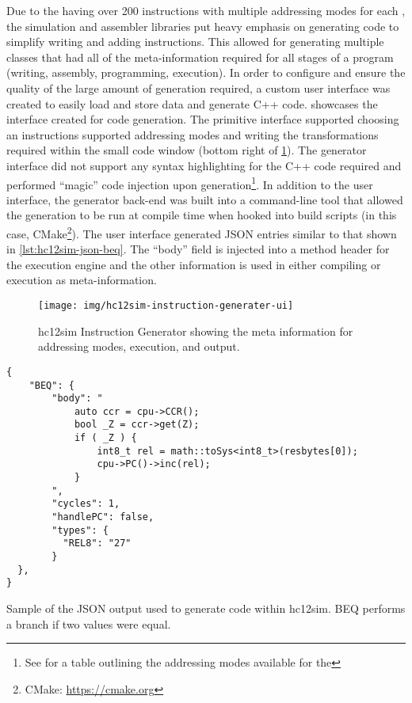 Due to the \hcmodel{} having over 200 instructions with multiple addressing modes for each \cite{hc12Manual2006}, the simulation and assembler libraries put heavy emphasis on generating code to simplify writing and adding instructions. This allowed for generating multiple classes that had all of the meta-information required for all stages of a program (writing, assembly, programming, execution). In order to configure and ensure the quality of the large amount of generation required, a custom user interface was created to easily load and store data and generate C++ code.  showcases the interface created for code generation. The primitive interface supported choosing an instructions supported addressing modes and writing the transformations required within the small code window (bottom right of \cref{fig:hc12sim-instruction-generater-ui}). The generator interface did not support any syntax highlighting for the C++ code required and performed ``magic'' code injection upon generation\footnote{See \cite[Table~3-1,~p.~30]{hc12Manual2006} for a table outlining the addressing modes available for the \hcmodel{}}. In addition to the user interface, the generator back-end was built into a command-line tool that allowed the generation to be run at compile time when hooked into build scripts (in this case, CMake\footnote{CMake: \url{https://cmake.org}}). The user interface generated JSON entries similar to that shown in \cref{lst:hc12sim-json-beq}. The ``body'' field is injected into a method header for the execution engine and the other information is used in either compiling or execution as meta-information.

\begin{figure}[h!t]
    \centering
    \texttt{[image: img/hc12sim-instruction-generater-ui]}
    \caption{hc12sim Instruction Generator showing the meta information for addressing modes, execution, and output.}
    \label{fig:hc12sim-instruction-generater-ui}
\end{figure}

\begin{listing}[htp]
\begin{verbatim}
{
    "BEQ": {
        "body": "
            auto ccr = cpu->CCR();
            bool _Z = ccr->get(Z);
            if ( _Z ) {
                int8_t rel = math::toSys<int8_t>(resbytes[0]);
                cpu->PC()->inc(rel);
            }
        ",
        "cycles": 1,
        "handlePC": false,
        "types": {
          "REL8": "27"
        }
  },
}
\end{verbatim}
\caption{Sample of the JSON output used to generate code within hc12sim. BEQ performs a branch if two values were equal.}
\label{lst:hc12sim-json-beq}
\end{listing}

